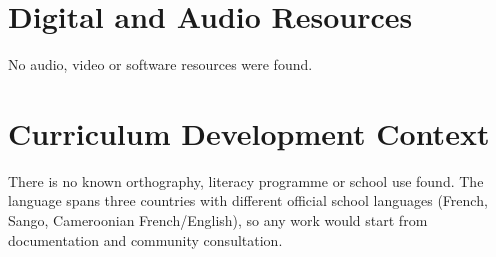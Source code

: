 \documentclass[12pt]{article}
\begin{document}
\section{Digital and Audio Resources}
No audio, video or software resources were found.

\section{Curriculum Development Context}
There is no known orthography, literacy programme or school use found. The language spans three countries with different official school languages (French, Sango, Cameroonian French/English), so any work would start from documentation and community consultation.
\end{document}

